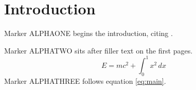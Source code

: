 \section{Introduction}
Marker ALPHAONE begins the introduction, citing \cite{knuth1984}.

\lipsum[1-3]

Marker ALPHATWO sits after filler text on the first pages.
\begin{equation}
  E = mc^2 + \int_0^1 x^2 \, dx \label{eq:main}
\end{equation}
Marker ALPHATHREE follows equation \eqref{eq:main}.
